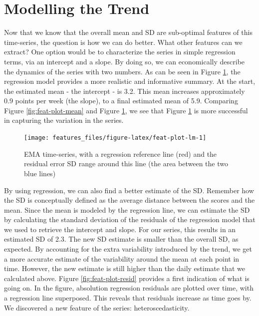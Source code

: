\documentclass[]{book}
\begin{document}
\section{Modelling the Trend}\label{modelling-the-trend}

Now that we know that the overall mean and SD are sub-optimal features
of this time-series, the question is how we can do better. What other
features can we extract? One option would be to characterize the series
in simple regression terms, via an intercept and a slope. By doing so,
we can economically describe the dynamics of the series with two
numbers. As can be seen in Figure \ref{fig:feat-plot-lm}, the regression
model provides a more realistic and informative summary. At the start,
the estimated mean - the intercept - is 3.2. This mean increases
approximately 0.9 points per week (the slope), to a final estimated mean
of 5.9. Comparing Figure \ref{fig:feat-plot-mean} and Figure
\ref{fig:feat-plot-lm}, we see that Figure \ref{fig:feat-plot-lm} is
more successful in capturing the variation in the series.

\begin{figure}

{\centering \texttt{[image: features\_files/figure-latex/feat-plot-lm-1]} 

}

\caption{EMA time-series, with a regression reference line (red) and the residual error SD range around this line (the area between the two blue lines)}\label{fig:feat-plot-lm}
\end{figure}

By using regression, we can also find a better estimate of the SD.
Remember how the SD is conceptually defined as the average distance
between the scores and the mean. Since the mean is modeled by the
regression line, we can estimate the SD by calculating the standard
deviation of the residuals of the regression model that we used to
retrieve the intercept and slope. For our series, this results in an
estimated SD of 2.3. The new SD estimate is smaller than the overall SD,
as expected. By accounting for the extra variability introduced by the
trend, we get a more accurate estimate of the variability around the
mean at each point in time. However, the new estimate is still higher
than the daily estimate that we calculated above. Figure
\ref{fig:feat-plot-resid} provides a first indication of what is going
on. In the figure, absolution regression residuals are plotted over
time, with a regression line superposed. This reveals that residuals
increase as time goes by. We discovered a new feature of the series:
heteroscedasticity.
\end{document}
